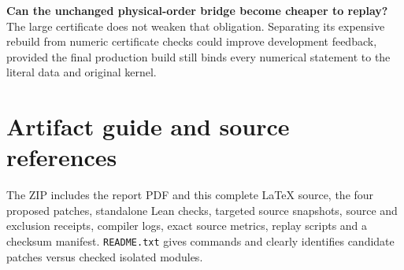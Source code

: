 \documentclass[11pt,letterpaper]{article}
\newcommand{\code}[1]{\nolinkurl{#1}}
\begin{document}
\textbf{Can the unchanged physical-order bridge become cheaper to replay?} The large certificate does not weaken that obligation. Separating its expensive rebuild from numeric certificate checks could improve development feedback, provided the final production build still binds every numerical statement to the literal data and original kernel.

\section{Artifact guide and source references}

The ZIP includes the report PDF and this complete LaTeX source, the four proposed patches, standalone Lean checks, targeted source snapshots, source and exclusion receipts, compiler logs, exact source metrics, replay scripts and a checksum manifest. \code{README.txt} gives commands and clearly identifies candidate patches versus checked isolated modules.
\end{document}

